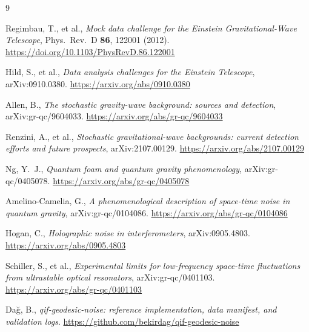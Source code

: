 \documentclass[11pt]{article}
\begin{document}
\begin{thebibliography}{9}

 Regimbau, T., et al., \emph{Mock data challenge for the Einstein Gravitational-Wave Telescope}, Phys.\ Rev.\ D \textbf{86}, 122001 (2012). \url{https://doi.org/10.1103/PhysRevD.86.122001}

 Hild, S., et al., \emph{Data analysis challenges for the Einstein Telescope}, arXiv:0910.0380. \url{https://arxiv.org/abs/0910.0380}

 Allen, B., \emph{The stochastic gravity-wave background: sources and detection}, arXiv:gr-qc/9604033. \url{https://arxiv.org/abs/gr-qc/9604033}

 Renzini, A., et al., \emph{Stochastic gravitational-wave backgrounds: current detection efforts and future prospects}, arXiv:2107.00129. \url{https://arxiv.org/abs/2107.00129}

 Ng, Y.~J., \emph{Quantum foam and quantum gravity phenomenology}, arXiv:gr-qc/0405078. \url{https://arxiv.org/abs/gr-qc/0405078}

 Amelino-Camelia, G., \emph{A phenomenological description of space-time noise in quantum gravity}, arXiv:gr-qc/0104086. \url{https://arxiv.org/abs/gr-qc/0104086}

 Hogan, C., \emph{Holographic noise in interferometers}, arXiv:0905.4803. \url{https://arxiv.org/abs/0905.4803}

 Schiller, S., et al., \emph{Experimental limits for low-frequency space-time fluctuations from ultrastable optical resonators}, arXiv:gr-qc/0401103. \url{https://arxiv.org/abs/gr-qc/0401103}

 Da\u{g}, B., \emph{qif-geodesic-noise: reference implementation, data manifest, and validation logs}. \url{https://github.com/bekirdag/qif-geodesic-noise}

\end{thebibliography}
\end{document}
